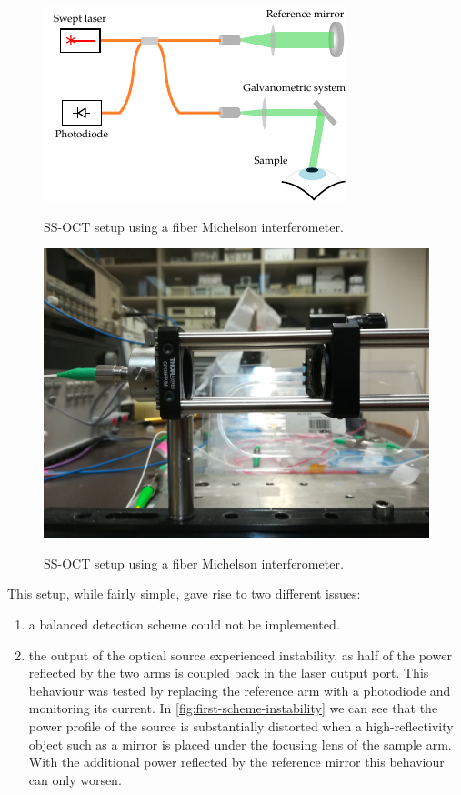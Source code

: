 \begin{figure}[bth]
	\myfloatalign
	{\includegraphics[width=0.8\linewidth]{gfx/setup-diagrams/basic-oct.pdf}}
	\caption{SS-OCT setup using a fiber Michelson interferometer.}\label{fig:basic-oct}
\end{figure}


\begin{figure}[bth]
	\myfloatalign
	{\includegraphics[width=0.6\linewidth]{gfx/ch3/reference-arm-photo}}
	\caption{SS-OCT setup using a fiber Michelson interferometer.}\label{fig:reference-arm-photo}
\end{figure}

This setup, while fairly simple, gave rise to two different issues:
\begin{enumerate}
	\item a balanced detection scheme could not be implemented.
	
	\item the output of the optical source experienced instability, as half of the power reflected by the two arms is coupled back in the laser output port. This behaviour was tested by replacing the reference arm with a photodiode and monitoring its current. In \autoref{fig:first-scheme-instability} we can see that the power profile of the source is substantially distorted when a high-reflectivity object such as a mirror is placed under the focusing lens of the sample arm. With the additional power reflected by the reference mirror this behaviour can only worsen. 
	
	
\end{enumerate}


